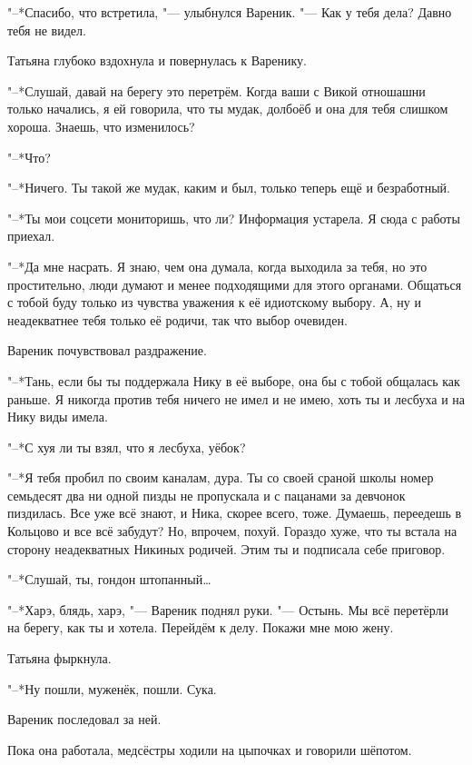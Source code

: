 \asterism

\textspace

"--*Спасибо, что встретила, "--- улыбнулся Вареник.
"--- Как у тебя дела?
Давно тебя не видел.

Татьяна глубоко вздохнула и повернулась к Варенику.

"--*Слушай, давай на берегу это перетрём.
Когда ваши с Викой отношашни только начались, я ей говорила, что ты мудак, долбоёб и она для тебя слишком хороша.
Знаешь, что изменилось?

"--*Что?

"--*Ничего.
Ты такой же мудак, каким и был, только теперь ещё и безработный.

"--*Ты мои соцсети мониторишь, что ли?
Информация устарела.
Я сюда с работы приехал.

"--*Да мне насрать.
Я знаю, чем она думала, когда выходила за тебя, но это простительно, люди думают и менее подходящими для этого органами.
Общаться с тобой буду только из чувства уважения к её идиотскому выбору.
А, ну и неадекватнее тебя только её родичи, так что выбор очевиден.

Вареник почувствовал раздражение.

"--*Тань, если бы ты поддержала Нику в её выборе, она бы с тобой общалась как раньше.
Я никогда против тебя ничего не имел и не имею, хоть ты и лесбуха и на Нику виды имела.

"--*С хуя ли ты взял, что я лесбуха, уёбок?

"--*Я тебя пробил по своим каналам, дура.
Ты со своей сраной школы номер семьдесят два ни одной пизды не пропускала и с пацанами за девчонок пиздилась.
Все уже всё знают, и Ника, скорее всего, тоже.
Думаешь, переедешь в Кольцово и все всё забудут?
Но, впрочем, похуй.
Гораздо хуже, что ты встала на сторону неадекватных Никиных родичей.
Этим ты и подписала себе приговор.

"--*Слушай, ты, гондон штопанный\dots{}

"--*Харэ, блядь, харэ, "--- Вареник поднял руки.
"--- Остынь.
Мы всё перетёрли на берегу, как ты и хотела.
Перейдём к делу.
Покажи мне мою жену.

Татьяна фыркнула.

"--*Ну пошли, муженёк, пошли.
Сука.

Вареник последовал за ней.

\asterism

\textspace

Пока она работала, медсёстры ходили на цыпочках и говорили шёпотом.

